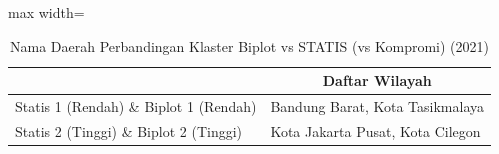 \begin{table}[H]
\centering
\caption{Nama Daerah Perbandingan Klaster Biplot vs STATIS (vs Kompromi) (2021)} \label{tab:sample2biplot_statis_name_2021}
\begin{adjustbox}{max width=\textwidth}
\begin{tabular}{|>{\centering\arraybackslash}p{4cm}|p{10cm}|}
\hline
\multicolumn{1}{|c|}{\textbf{Kategori}} & \multicolumn{1}{c|}{\textbf{Daftar Wilayah}} \\
\hline
Statis 1 (Rendah) \& Biplot 1 (Rendah) & Bandung Barat, Kota Tasikmalaya \\
\hline
Statis 2 (Tinggi) \& Biplot 2 (Tinggi) & Kota Jakarta Pusat, Kota Cilegon \\
\hline
\end{tabular}
\end{adjustbox}
\end{table}